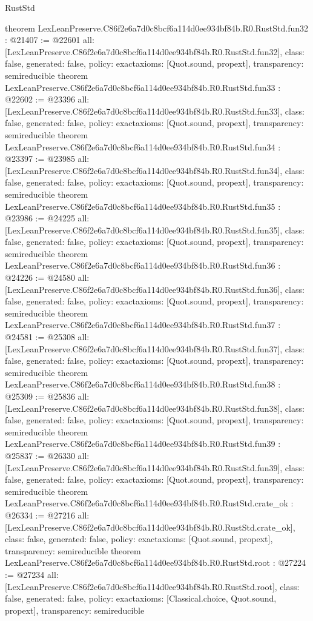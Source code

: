 \begin{lexlean}{RustStd}
\begin{coremodule}
{}
theorem LexLeanPreserve.C86f2e6a7d0c8bcf6a114d0ee934bf84b.R0.RustStd.fun32 : @21407 := @22601 {
  all: [LexLeanPreserve.C86f2e6a7d0c8bcf6a114d0ee934bf84b.R0.RustStd.fun32],
  class: false,
  generated: false,
  policy: exact{axioms: [Quot.sound, propext]},
  transparency: semireducible
}
theorem LexLeanPreserve.C86f2e6a7d0c8bcf6a114d0ee934bf84b.R0.RustStd.fun33 : @22602 := @23396 {
  all: [LexLeanPreserve.C86f2e6a7d0c8bcf6a114d0ee934bf84b.R0.RustStd.fun33],
  class: false,
  generated: false,
  policy: exact{axioms: [Quot.sound, propext]},
  transparency: semireducible
}
theorem LexLeanPreserve.C86f2e6a7d0c8bcf6a114d0ee934bf84b.R0.RustStd.fun34 : @23397 := @23985 {
  all: [LexLeanPreserve.C86f2e6a7d0c8bcf6a114d0ee934bf84b.R0.RustStd.fun34],
  class: false,
  generated: false,
  policy: exact{axioms: [Quot.sound, propext]},
  transparency: semireducible
}
theorem LexLeanPreserve.C86f2e6a7d0c8bcf6a114d0ee934bf84b.R0.RustStd.fun35 : @23986 := @24225 {
  all: [LexLeanPreserve.C86f2e6a7d0c8bcf6a114d0ee934bf84b.R0.RustStd.fun35],
  class: false,
  generated: false,
  policy: exact{axioms: [Quot.sound, propext]},
  transparency: semireducible
}
theorem LexLeanPreserve.C86f2e6a7d0c8bcf6a114d0ee934bf84b.R0.RustStd.fun36 : @24226 := @24580 {
  all: [LexLeanPreserve.C86f2e6a7d0c8bcf6a114d0ee934bf84b.R0.RustStd.fun36],
  class: false,
  generated: false,
  policy: exact{axioms: [Quot.sound, propext]},
  transparency: semireducible
}
theorem LexLeanPreserve.C86f2e6a7d0c8bcf6a114d0ee934bf84b.R0.RustStd.fun37 : @24581 := @25308 {
  all: [LexLeanPreserve.C86f2e6a7d0c8bcf6a114d0ee934bf84b.R0.RustStd.fun37],
  class: false,
  generated: false,
  policy: exact{axioms: [Quot.sound, propext]},
  transparency: semireducible
}
theorem LexLeanPreserve.C86f2e6a7d0c8bcf6a114d0ee934bf84b.R0.RustStd.fun38 : @25309 := @25836 {
  all: [LexLeanPreserve.C86f2e6a7d0c8bcf6a114d0ee934bf84b.R0.RustStd.fun38],
  class: false,
  generated: false,
  policy: exact{axioms: [Quot.sound, propext]},
  transparency: semireducible
}
theorem LexLeanPreserve.C86f2e6a7d0c8bcf6a114d0ee934bf84b.R0.RustStd.fun39 : @25837 := @26330 {
  all: [LexLeanPreserve.C86f2e6a7d0c8bcf6a114d0ee934bf84b.R0.RustStd.fun39],
  class: false,
  generated: false,
  policy: exact{axioms: [Quot.sound, propext]},
  transparency: semireducible
}
theorem LexLeanPreserve.C86f2e6a7d0c8bcf6a114d0ee934bf84b.R0.RustStd.crate_ok : @26334 := @27216 {
  all: [LexLeanPreserve.C86f2e6a7d0c8bcf6a114d0ee934bf84b.R0.RustStd.crate_ok],
  class: false,
  generated: false,
  policy: exact{axioms: [Quot.sound, propext]},
  transparency: semireducible
}
theorem LexLeanPreserve.C86f2e6a7d0c8bcf6a114d0ee934bf84b.R0.RustStd.root : @27224 := @27234 {
  all: [LexLeanPreserve.C86f2e6a7d0c8bcf6a114d0ee934bf84b.R0.RustStd.root],
  class: false,
  generated: false,
  policy: exact{axioms: [Classical.choice, Quot.sound, propext]},
  transparency: semireducible
}


\end{coremodule}
\end{lexlean}
